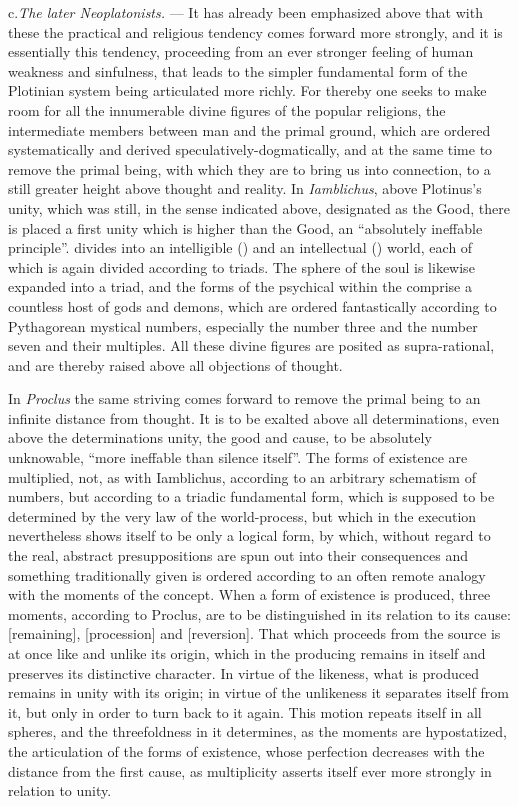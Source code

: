 \divrule

c.\enspace \emph{The later Neoplatonists.} --- It has already been
emphasized above that with these the practical and religious tendency
comes forward more strongly, and it is essentially this tendency,
proceeding from an ever stronger feeling of human weakness and
sinfulness, that leads to the simpler fundamental form of the Plotinian
system being articulated more richly. For thereby one seeks to make room
for all the innumerable divine figures of the popular religions, the
intermediate members between man and the primal ground, which are
ordered systematically and derived speculatively-dogmatically, and at
the same time to remove the primal being, with which they are to bring
us into connection, to a still greater height above thought and
reality. In \emph{Iamblichus}, above Plotinus's unity, which was still,
in the sense indicated above, designated as the Good, there is placed a
first unity which is higher than the Good, an ``absolutely ineffable
principle''.  divides into an intelligible () and an
intellectual () world, each of which is again divided according
to triads. The sphere of the soul is likewise expanded into a triad,
and the forms of the psychical within the  comprise a countless
host of gods and demons, which are ordered fantastically according to
Pythagorean mystical numbers, especially the number three and the
number seven and their multiples. All these divine figures are posited
as supra-rational, and are thereby raised above all objections of
thought.

In \emph{Proclus} the same striving comes forward to remove the primal
being to an infinite distance from thought. It is to be exalted above
all determinations, even above the determinations unity, the good and
cause, to be absolutely
unknowable, ``more ineffable than silence itself''. The forms
of existence are multiplied, not, as with Iamblichus, according to an
arbitrary schematism of numbers, but according to a triadic fundamental
form, which is supposed to be determined by the very law of the
world-process, but which in the execution nevertheless shows itself to
be only a logical form, by which, without regard to the real, abstract
presuppositions are spun out into their consequences and something
traditionally given is ordered according to an often remote analogy
with the moments of the concept. When a form of existence is produced,
three moments, according to Proclus, are to be distinguished in its
relation to its cause:  [remaining],  [procession] and  [reversion].
That which proceeds from the source is at once like and unlike its
origin, which in the producing remains in itself and preserves its
distinctive character. In virtue of the likeness, what is produced
remains in unity with its origin; in virtue of the unlikeness it
separates itself from it, but only in order to turn back to it again.
This motion repeats itself in all spheres, and the threefoldness in it
determines, as the moments are hypostatized, the articulation of the
forms of existence, whose perfection decreases with the distance from
the first cause, as multiplicity asserts itself ever more strongly in
relation to unity.

